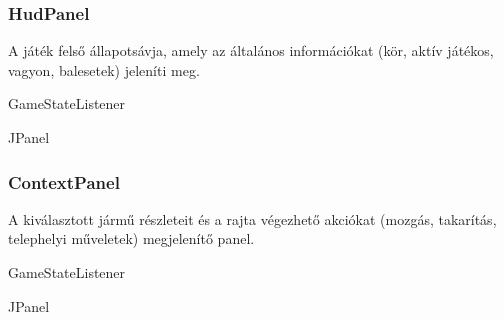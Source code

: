 \subsubsection{HudPanel}
\begin{class-template-responsibility}
    A játék felső állapotsávja, amely az általános információkat (kör, aktív játékos, vagyon, balesetek) jeleníti meg.
\end{class-template-responsibility}
\begin{class-template-interface}
    GameStateListener
\end{class-template-interface}
\begin{class-template-baseclass}
    JPanel
\end{class-template-baseclass}
\begin{class-template-attribute}
\end{class-template-attribute}
\begin{class-template-method}
\end{class-template-method}

\subsubsection{ContextPanel}
\begin{class-template-responsibility}
    A kiválasztott jármű részleteit és a rajta végezhető akciókat (mozgás, takarítás, telephelyi műveletek) megjelenítő panel.
\end{class-template-responsibility}
\begin{class-template-interface}
    GameStateListener
\end{class-template-interface}
\begin{class-template-baseclass}
    JPanel
\end{class-template-baseclass}
\begin{class-template-attribute}
\end{class-template-attribute}
\begin{class-template-method}
\end{class-template-method}

